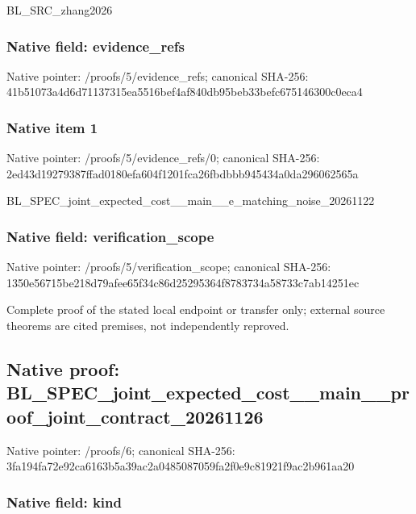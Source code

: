 \documentclass[10pt,a4paper]{article}
\begin{document}
BL\_SRC\_zhang2026


\subsubsection{Native field: evidence\_refs}


Native pointer: /proofs/5/evidence\_refs; canonical SHA-256: 41b51073a4d6d71137315ea5\allowbreak{}516bef4af840db95beb33bef\allowbreak{}c675146300c0eca4



\subsubsection{Native item 1}


Native pointer: /proofs/5/evidence\_refs/0; canonical SHA-256: 2ed43d19279387ffad0180ef\allowbreak{}a604f1201fca26fbdbbb9454\allowbreak{}34a0da296062565a


BL\_SPEC\_joint\_expected\_c\allowbreak{}ost\_\_main\_\_e\_matching\_no\allowbreak{}ise\_20261122


\subsubsection{Native field: verification\_scope}


Native pointer: /proofs/5/verification\_scope; canonical SHA-256: 1350e56715be218d79afee65\allowbreak{}f34c86d25295364f8783734a\allowbreak{}58733c7ab14251ec


Complete proof of the stated local endpoint or transfer only; external source theorems are cited premises, not independently reproved.


\subsection{Native proof: BL\_SPEC\_joint\_expected\_c\allowbreak{}ost\_\_main\_\_proof\_joint\_c\allowbreak{}ontract\_20261126}


Native pointer: /proofs/6; canonical SHA-256: 3fa194fa72e92ca6163b5a39\allowbreak{}ac2a0485087059fa2f0e9c81\allowbreak{}921f9ac2b961aa20



\subsubsection{Native field: kind}
\end{document}
